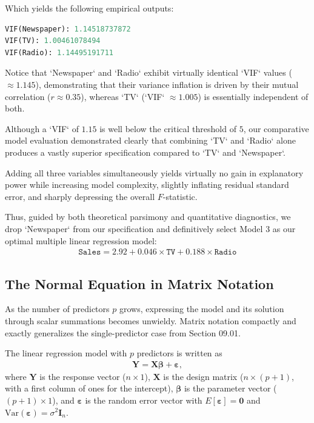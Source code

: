 Which yields the following empirical outputs:
\begin{lstlisting}[language=Python]
VIF(Newspaper): 1.14518737872
VIF(TV): 1.00461078494
VIF(Radio): 1.14495191711
\end{lstlisting}

Notice that `Newspaper` and `Radio` exhibit virtually identical `VIF` values ($\approx 1.145$), demonstrating that their variance inflation is driven by their mutual correlation ($r \approx 0.35$), whereas `TV` (`VIF` $\approx 1.005$) is essentially independent of both.

Although a `VIF` of $1.15$ is well below the critical threshold of $5$, our comparative model evaluation demonstrated clearly that combining `TV` and `Radio` alone produces a vastly superior specification compared to `TV` and `Newspaper`.

Adding all three variables simultaneously yields virtually no gain in explanatory power while increasing model complexity, slightly inflating residual standard error, and sharply depressing the overall $F$-statistic.

Thus, guided by both theoretical parsimony and quantitative diagnostics, we drop `Newspaper` from our specification and definitively select Model 3 as our optimal multiple linear regression model:
\begin{align}
	\texttt{Sales} = 2.92 + 0.046 \times \texttt{TV} + 0.188 \times \texttt{Radio}
\end{align}

\subsection{The Normal Equation in Matrix Notation}

As the number of predictors $p$ grows, expressing the model and its solution through scalar summations becomes unwieldy. Matrix notation compactly and exactly generalizes the single-predictor case from Section 09.01.

\begin{definicion}
	The linear regression model with $p$ predictors is written as
	\begin{align}
		\mathbf{Y} = \mathbf{X}\boldsymbol{\beta} + \boldsymbol{\varepsilon},
	\end{align}
	where $\mathbf{Y}$ is the response vector ($n\times1$), $\mathbf{X}$ is the design matrix ($n\times(p+1)$, with a first column of ones for the intercept), $\boldsymbol{\beta}$ is the parameter vector ($(p+1)\times1$), and $\boldsymbol{\varepsilon}$ is the random error vector with $E[\boldsymbol{\varepsilon}]=\mathbf{0}$ and $\text{Var}(\boldsymbol{\varepsilon})=\sigma^2\mathbf{I}_n$.
\end{definicion}

